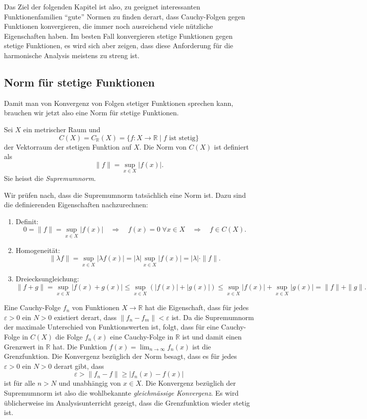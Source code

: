 Das Ziel der folgenden Kapitel ist also, zu geeignet interessanten
Funktionenfamilien ``gute'' Normen zu finden derart, dass Cauchy-Folgen
gegen Funktionen konvergieren, die immer noch ausreichend viele
nützliche Eigenschaften haben.
Im besten Fall konvergieren stetige Funktionen gegen stetige Funktionen,
es wird sich aber zeigen, dass diese Anforderung für die
harmonische Analysis meistens zu streng ist.

%
%
\subsection{Norm für stetige Funktionen
\label{buch:skalarprodukt:subsection:normfuerstetigefunktionen}}
Damit man von Konvergenz von Folgen stetiger Funktionen sprechen kann,
brauchen wir jetzt also eine Norm für stetige Funktionen.

\begin{definition}[Supremumnorm]
\label{buch:skalarprodukt:funktionenraume:def:supremumnorm}
Sei $X$ ein metrischer Raum und
\[
C(X)
=
C_{\mathbb{R}}(X)
=
\{
f\colon X \to\mathbb{R}\mid
\text{$f$ ist stetig}
\}
\]
der Vektorraum der stetigen Funktion auf $X$.
Die Norm von $C(X)$ ist definiert als
\[
\|f\| = \sup_{x\in X} |f(x)|.
\]
Sie heisst die {\em Supremumnorm}.
\end{definition}

Wir prüfen nach, dass die Supremumnorm tatsächlich eine Norm ist.
Dazu sind die definierenden Eigenschaften nachzurechnen:
\begin{enumerate}
\item Definit: 
\[
0
=
\|f\|
=
\sup_{x\in X} |f(x)|
\quad\Rightarrow\quad
f(x)=0 \;\forall x\in X
\quad\Rightarrow\quad
f\in C(X).
\]
\item Homogeneität:
\[
\|\lambda f\|
=
\sup_{x\in X} |\lambda f(x)|
=
|\lambda| \sup_{x\in X} |f(x)|
=
|\lambda| \cdot \|f\|.
\]
\item
Dreiecksungleichung:
\[
\|f+g\|
=
\sup_{x\in X}|f(x)+g(x)|
\le
\sup_{x\in X}(|f(x)|+|g(x)|)
\le
\sup_{x\in X}|f(x)|+\sup_{x\in X}|g(x)|
=
\|f\| + \|g\|.
\]
\end{enumerate}

Eine Cauchy-Folge $f_n$ von Funktionen $X\to \mathbb{R}$ hat die
Eigenschaft, dass für jedes $\varepsilon >0$ ein $N>0$ existiert
derart, dass $\|f_n-f_m\|<\varepsilon$ ist.
Da die Supremumnorm der maximale Unterschied von Funktionswerten ist,
folgt, dass für eine Cauchy-Folge in $C(X)$ die Folge $f_n(x)$ eine
Cauchy-Folge in $\mathbb{R}$ ist und damit einen Grenzwert in $\mathbb{R}$
hat.
Die Funktion $f(x) = \lim_{n\to\infty}f_n(x)$ ist die Grenzfunktion.
Die Konvergenz bezüglich der Norm besagt, dass es für jedes $\varepsilon>0$
ein $N>0$ derart gibt, dass
\[
\varepsilon 
>
\|f_n-f\|
\ge 
|f_n(x)-f(x)|
\]
ist für alle $n>N$ und unabhängig von $x\in X$.
Die Konvergenz bezüglich der Supremumnorm ist also die wohlbekannte
{\em gleichmässige Konvergenz}.
Es wird üblicherweise im Analysisunterricht gezeigt, dass die
Grenzfunktion wieder stetig ist.


